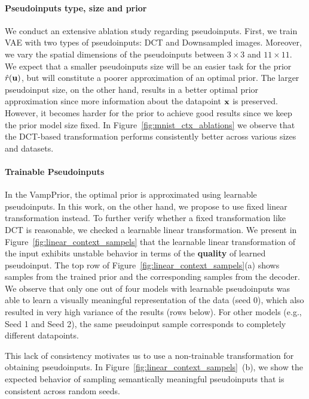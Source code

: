 \paragraph{Pseudoinputs type, size and prior}
We conduct an extensive ablation study regarding pseudoinputs. First, we train VAE with two types of pseudoinputs: DCT and Downsampled images. Moreover, we vary the spatial dimensions of the pseudoinputs between $3\times 3$ and $11\times 11$. We expect that a smaller pseudoinputs size will be an easier task for the prior $\hat{r}({\mathbf{u}})$, but will constitute a poorer approximation of an optimal prior. The larger pseudoinput size, on the other hand, results in a better optimal prior approximation since more information about the datapoint ${\mathbf{x}}$ is preserved. However, it becomes harder for the prior to achieve good results since we keep the prior model size fixed.
In Figure~\ref{fig:mnist_ctx_ablations} we observe that the DCT-based transformation performs consistently better across various sizes and datasets. 

\paragraph{Trainable Pseudoinputs}
In the VampPrior, the optimal prior is approximated using learnable pseudoinputs. In this work, on the other hand, we propose to use fixed linear transformation instead. To further verify whether a fixed transformation like DCT is reasonable, we checked a learnable linear transformation. We present in Figure~\ref{fig:linear_context_sampels} that the learnable linear transformation of the input exhibits unstable behavior in terms of the \textbf{quality} of learned pseudoinput. The top row of Figure~\ref{fig:linear_context_sampels}(a) shows samples from the trained prior and the corresponding samples from the decoder. 
We observe that only one out of four models with learnable pseudoinputs was able to learn a visually meaningful representation of the data (seed 0), which also resulted in very high variance of the results (rows below). For other models (e.g., Seed 1 and Seed 2), the same pseudoinput sample corresponds to completely different datapoints.

This lack of consistency motivates us to use a non-trainable transformation for obtaining pseudoinputs. In Figure~\ref{fig:linear_context_sampels}~(b), we show the expected behavior of sampling semantically meaningful pseudoinputs that is consistent across random seeds.


